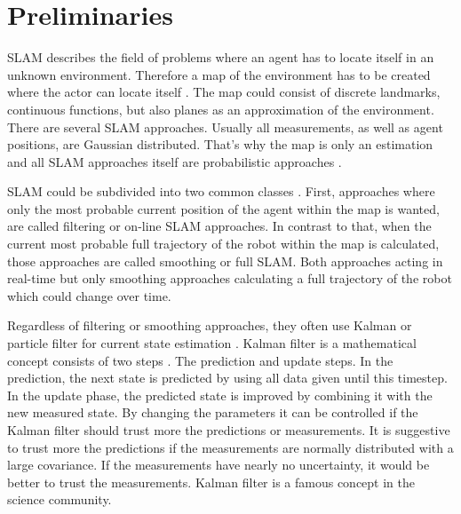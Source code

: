 \section{Preliminaries}

SLAM describes the field of problems where an agent has to locate itself in an unknown environment. Therefore a map of the environment has to be created where the actor can locate itself \cite{grisetti_tutorial_2010}. The map could consist of discrete landmarks, continuous functions, but also planes as an approximation of the environment. There are several SLAM approaches. Usually all measurements, as well as agent positions, are Gaussian distributed. That's why the map is only an estimation and all SLAM approaches itself are probabilistic approaches \cite{grisetti_tutorial_2010}.

SLAM could be subdivided into two common classes \cite{grisetti_tutorial_2010}. First, approaches where only the most probable current position of the agent within the map is wanted, are called filtering or on-line SLAM approaches. In contrast to that, when the current most probable full trajectory of the robot within the map is calculated, those approaches are called smoothing or full SLAM. Both approaches acting in real-time but only smoothing approaches calculating a full trajectory of the robot which could change over time.

Regardless of filtering or smoothing approaches, they often use Kalman or particle filter for current state estimation \cite{grisetti_tutorial_2010}. Kalman filter is a mathematical concept consists of two steps \cite{kalman1960}. The prediction and update steps. In the prediction, the next state is predicted by using all data given until this timestep. In the update phase, the predicted state is improved by combining it with the new measured state. By changing the parameters it can be controlled if the Kalman filter should trust more the predictions or measurements. It is suggestive to trust more the predictions if the measurements are normally distributed with a large covariance. If the measurements have nearly no uncertainty, it would be better to trust the measurements. Kalman filter is a famous concept in the science community. 

